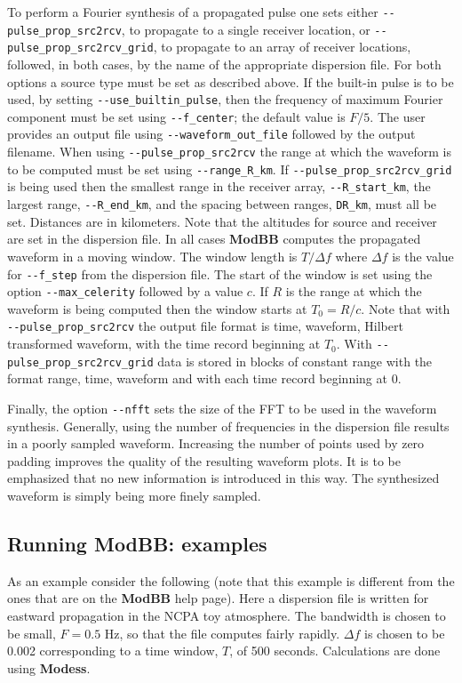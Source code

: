 To perform a Fourier synthesis of a propagated pulse one sets either \verb+--pulse_prop_src2rcv+, to propagate to a single receiver location, or \verb+--pulse_prop_src2rcv_grid+, to propagate to an array of receiver locations, followed, in both cases, by the name of the appropriate dispersion file. For both options a source type must be set as described above. If the built-in pulse is to be used, by setting \verb+--use_builtin_pulse+, then the frequency of maximum Fourier component must be set using \verb+--f_center+; the default value is $F/5$. The user provides an output file using \verb+--waveform_out_file+ followed by the output filename. When using \verb+--pulse_prop_src2rcv+ the range at which the waveform is to be computed must be set using \verb+--range_R_km+. If \verb+--pulse_prop_src2rcv_grid+ is being used then the smallest range in the receiver array, \verb+--R_start_km+, the largest range, \verb+--R_end_km+, and the spacing between ranges, \verb+DR_km+, must all be set. Distances are in kilometers. Note that the altitudes for source and receiver are set in the dispersion file. In all cases {\bf ModBB} computes the propagated waveform in a moving window. The window length is $T/\Delta f$ where $\Delta f$ is the value for \verb+--f_step+ from the dispersion file. The start of the window is set using the option \verb+--max_celerity+ followed by a value $c$. If $R$ is the range at which the waveform is being computed then the window starts at $T_0=R/c$. Note that with \verb+--pulse_prop_src2rcv+ the output file format is time, waveform, Hilbert transformed waveform, with the time record beginning at $T_0$. With \verb+--pulse_prop_src2rcv_grid+ data is stored in blocks of constant range with the format range, time, waveform and with each time record beginning at 0. 

Finally, the option \verb+--nfft+ sets the size of the FFT to be used in the waveform synthesis. Generally, using the number of frequencies in the dispersion file results in a poorly sampled waveform. Increasing the number of points used by zero padding improves the quality of the resulting waveform plots. It is to be emphasized that no new information is introduced in this way. The synthesized waveform is simply being more finely sampled. 

\subsection{Running ModBB: examples}
\label{sec: modbb examples}

As an example consider the following (note that this example is different from the ones that are on the {\bf ModBB} help page). Here a dispersion file is written for eastward propagation in the NCPA toy atmosphere. The bandwidth is chosen to be small, $F=0.5$ Hz, so that the file computes fairly rapidly. $\Delta f$ is chosen to be 0.002 corresponding to a time window, $T$, of 500 seconds. Calculations are done using {\bf Modess}. 

